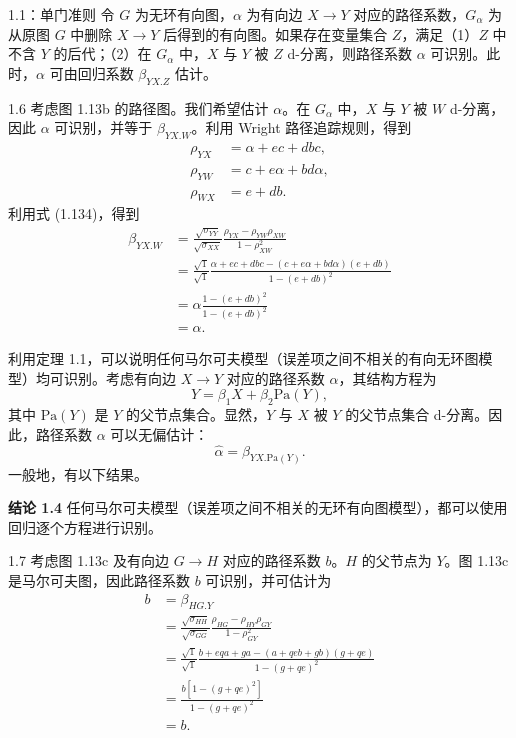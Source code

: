 

\begin{booktheorem}{1.1：单门准则}
令 $G$ 为无环有向图，$\alpha$ 为有向边 $X\to Y$ 对应的路径系数，$G_\alpha$ 为从原图 $G$ 中删除 $X\to Y$ 后得到的有向图。如果存在变量集合 $Z$，满足（1）$Z$ 中不含 $Y$ 的后代；（2）在 $G_\alpha$ 中，$X$ 与 $Y$ 被 $Z$ d-分离，则路径系数 $\alpha$ 可识别。此时，$\alpha$ 可由回归系数 $\beta_{YX.Z}$ 估计。
\end{booktheorem}

\begin{bookexample}{1.6}
考虑图 1.13b 的路径图。我们希望估计 $\alpha$。在 $G_\alpha$ 中，$X$ 与 $Y$ 被 $W$ d-分离，因此 $\alpha$ 可识别，并等于 $\beta_{YX.W}$。利用 Wright 路径追踪规则，得到
\[
\begin{aligned}
\rho_{YX}&=\alpha+ec+dbc,\\
\rho_{YW}&=c+e\alpha+bd\alpha,\\
\rho_{WX}&=e+db.
\end{aligned}
\]
利用式 (1.134)，得到
\[
\begin{aligned}
\beta_{YX.W}
&=\frac{\sqrt{\sigma_{YY}}}{\sqrt{\sigma_{XX}}}
\frac{\rho_{YX}-\rho_{YW}\rho_{XW}}{1-\rho_{XW}^2}\\
&=\frac{\sqrt1}{\sqrt1}
\frac{\alpha+ec+dbc-(c+e\alpha+bd\alpha)(e+db)}
{1-(e+db)^2}\\
&=\alpha\frac{1-(e+db)^2}{1-(e+db)^2}\\
&=\alpha.
\end{aligned}
\]
\end{bookexample}

利用定理 1.1，可以说明任何马尔可夫模型（误差项之间不相关的有向无环图模型）均可识别。考虑有向边 $X\to Y$ 对应的路径系数 $\alpha$，其结构方程为
\[
Y=\beta_1X+\beta_2\mathrm{Pa}(Y),
\]
其中 $\mathrm{Pa}(Y)$ 是 $Y$ 的父节点集合。显然，$Y$ 与 $X$ 被 $Y$ 的父节点集合 d-分离。因此，路径系数 $\alpha$ 可以无偏估计：
\[
\widehat\alpha=\beta_{YX.\mathrm{Pa}(Y)}.
\]
一般地，有以下结果。

\medskip\noindent\textbf{结论 1.4}\quad
任何马尔可夫模型（误差项之间不相关的无环有向图模型），都可以使用回归逐个方程进行识别。
\par\medskip

\begin{bookexample}{1.7}
考虑图 1.13c 及有向边 $G\to H$ 对应的路径系数 $b$。$H$ 的父节点为 $Y$。图 1.13c 是马尔可夫图，因此路径系数 $b$ 可识别，并可估计为
\[
\begin{aligned}
b&=\beta_{HG.Y}\\
&=\frac{\sqrt{\sigma_{HH}}}{\sqrt{\sigma_{GG}}}
\frac{\rho_{HG}-\rho_{HY}\rho_{GY}}{1-\rho_{GY}^2}\\
&=\frac{\sqrt1}{\sqrt1}
\frac{b+eqa+ga-(a+qeb+gb)(g+qe)}{1-(g+qe)^2}\\
&=\frac{b[1-(g+qe)^2]}{1-(g+qe)^2}\\
&=b.
\end{aligned}
\]
\end{bookexample}
\FloatBarrier

